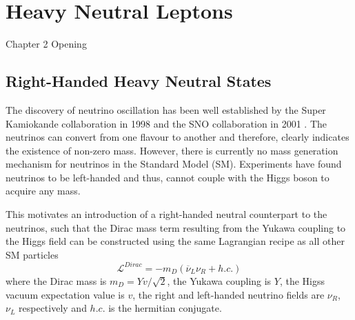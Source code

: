 
\chapter{Heavy Neutral Leptons}

\ifpdf
    \graphicspath{{Chapter2/Figs/Raster/}{Chapter2/Figs/PDF/}{Chapter2/Figs/}}
\else
    \graphicspath{{Chapter2/Figs/Vector/}{Chapter2/Figs/}}
\fi


Chapter 2 Opening

\newpage
\section{Right-Handed Heavy Neutral States}

The discovery of neutrino oscillation has been well established by the Super Kamiokande collaboration in 1998 \cite{} and the SNO collaboration in 2001 \cite{}. 
The neutrinos can convert from one flavour to another and therefore, clearly indicates the existence of non-zero mass.
However, there is currently no mass generation mechanism for neutrinos in the Standard Model (SM).
Experiments have found neutrinos to be left-handed \cite{} and thus, cannot couple with the Higgs boson to acquire any mass.

This motivates an introduction of a right-handed neutral counterpart to the neutrinos, such that the Dirac mass term resulting from the Yukawa coupling to the Higgs field can be constructed using the same Lagrangian recipe as all other SM particles
\begin{equation}
\mathcal{L}^{Dirac} = -m_{D}(\overline{\nu}_{L}\nu_{R} + h.c.)
\end{equation}
where the Dirac mass is $m_{D} = Yv/\sqrt{2}$, the Yukawa coupling is $Y$, the Higss vacuum expectation value is $v$, the right and left-handed neutrino fields are $\nu_{R}$, $\nu_{L}$ respectively and $h.c.$ is the hermitian conjugate.

